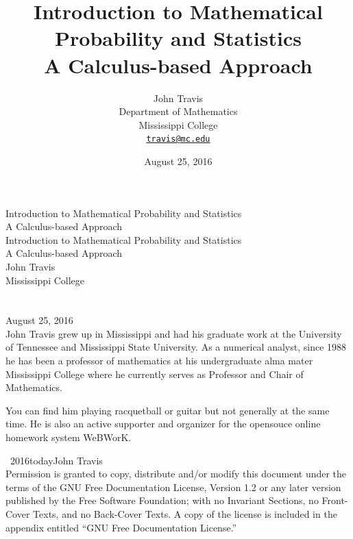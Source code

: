 \documentclass[10pt,]{book}
\title{Introduction to Mathematical Probability and Statistics\\
{\large A Calculus-based Approach}}
\author{John Travis\\
Department of Mathematics\\
Mississippi College\\
\href{mailto:travis@mc.edu}{\nolinkurl{travis@mc.edu}}
}
\date{August 25, 2016}
\theoremstyle{plain}
\theoremstyle{definition}
\theoremstyle{definition}
\numberwithin{equation}{section}
\begin{document}
\frontmatter
\thispagestyle{empty}
{\centering
\vspace*{0.28\textheight}
{\Huge Introduction to Mathematical Probability and Statistics}\\[2\baselineskip]
{\LARGE A Calculus-based Approach}\\
}
\clearpage
\thispagestyle{empty}
\null%
\clearpage
\thispagestyle{empty}
{\centering
\vspace*{0.14\textheight}
{\Huge Introduction to Mathematical Probability and Statistics}\\[\baselineskip]
{\LARGE A Calculus-based Approach}\\[3\baselineskip]
{\Large John Travis}\\[0.5\baselineskip]
{\Large Mississippi College}\\[3\baselineskip]
{\Large }\\[0.5\baselineskip]
{\normalsize }\\[3\baselineskip]
{\Large August 25, 2016}\\}
\clearpage
\thispagestyle{empty}
\noindent
John Travis grew up in Mississippi and had his graduate work at the University of Tennessee and Mississippi State University. As a numerical analyst, since 1988 he has been a professor of mathematics at his undergraduate alma mater Mississippi College where he currently serves as Professor and Chair of Mathematics.%
\par
You can find him playing racquetball or guitar but not generally at the same time. He is also an active supporter and organizer for the opensouce online homework system WeBWorK.%
\par
{}
\noindent\textcopyright\ 2016\textendash{}today\quad{}John Travis\\[0.5\baselineskip]
Permission is granted to copy, distribute and/or modify this document under the terms of the GNU Free Documentation License, Version 1.2 or any later version published by the Free Software Foundation; with no Invariant Sections, no Front-Cover Texts, and no Back-Cover Texts.  A copy of the license is included in the appendix entitled ``GNU Free Documentation License.''\par
{}
\null\clearpage
\end{document}
